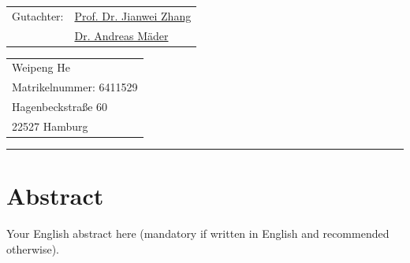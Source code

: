 \documentclass[12pt,final,twoside]{report}
\makeatletter
\newcommand{\trauthor}{Weipeng He}
\newcommand{\trmatrikelnummer}{6411529}
\newcommand{\trstrasse}{Hagenbeckstra\ss e 60}
\newcommand{\trort}{22527 Hamburg}
\newcommand{\trgutachterA}{\href{mailto:zhang@informatik.uni-hamburg.de}{Prof. Dr. Jianwei Zhang}}
\newcommand{\trgutachterB}{\href{mailto:maeder@informatik.uni-hamburg.de}{Dr. Andreas M\"ader}}
\theoremstyle{plain}
\theoremstyle{definition}
\theoremstyle{remark}
\makeatother
\begin{document}
\begin{titlepage}
    \vspace{1cm}
    \begin{center}
    \begin{tabular}{ll}
    Gutachter: & \trgutachterA \\
                   & \trgutachterB \\
    \end{tabular}
    \end{center}
    \vfill
    \begin{tabular}{l}
    \trauthor \\
    Matrikelnummer:  \trmatrikelnummer \\
    \trstrasse \\
    \trort
    \end{tabular}
    \newline
    \rule{\textwidth}{0.4pt}
    \newpage 
\end{titlepage}

\thispagestyle{empty}
\hspace{1cm}
\newpage

\section*{Abstract}\label{sec:abstract}
Your English abstract here (mandatory if written in English and recommended otherwise).


\cleardoublepage

\setcounter{tocdepth}{1}               %
\tableofcontents
\cleardoublepage
\listoffigures
\cleardoublepage
{}
\listoftables
\cleardoublepage

\fancyhead[LE]{\it \leftmark}           %
\fancyhead[RO]{\it \rightmark}          %
\fancyhead[LO,RE]{}                     %
\end{document}
